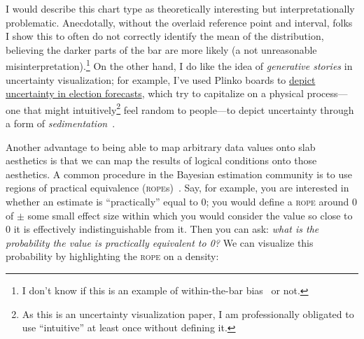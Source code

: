 \documentclass[journal]{vgtc}              %
\begin{document}
I would describe this chart type as theoretically interesting but interpretationally problematic. Anecdotally, without the overlaid reference point and interval, folks I show this to often do not correctly identify the mean of the distribution, believing the darker parts of the bar are more likely (a not unreasonable misinterpretation).\footnote{I don't know if this is an example of within-the-bar bias~\cite{newman2012bar} or not.} On the other hand, I do like the idea of \textit{generative stories} in uncertainty visualization; for example, I've used Plinko boards to \href{https://presidential-plinko.com/}{depict uncertainty in election forecasts}, which try to capitalize on a physical process---one that might intuitively\footnote{As this is an uncertainty visualization paper, I am professionally obligated to use ``intuitive'' at least once without defining it.} feel random to people---to depict uncertainty through a form of \textit{sedimentation}~\cite{huron2013sediment}.

Another advantage to being able to map arbitrary data values onto slab aesthetics is that we can map the results of logical conditions onto those aesthetics. A common procedure in the Bayesian estimation community is to use regions of practical equivalence (\textsc{rope}s)~\cite{kruschke2018rejecting}. Say, for example, you are interested in whether an estimate is ``practically'' equal to 0; you would define a \textsc{rope} around 0 of $\pm$ some small effect size within which you would consider the value so close to 0 it is effectively indistinguishable from it. Then you can ask: \textit{what is the probability the value is practically equivalent to 0?} We can visualize this probability by highlighting the \textsc{rope} on a density:
\end{document}
